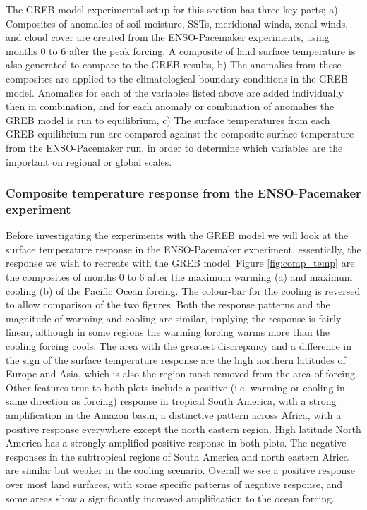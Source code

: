 The GREB model experimental setup for this section has three key parts; a) 
Composites of anomalies of soil moisture, SSTs, meridional winds, zonal winds, 
and cloud cover are created from the ENSO-Pacemaker experiments, using months 0 
to 6 after the peak forcing.  A composite of land surface temperature is also 
generated to compare to the GREB results, b) The anomalies from these composites 
are applied to the climatological boundary conditions in the GREB model.  
Anomalies for each of the variables listed above are added individually then in 
combination, and for each anomaly or combination of anomalies the GREB model is 
run to equilibrium, c) The surface temperatures from each GREB equilibrium run 
are compared against the composite surface temperature from the ENSO-Pacemaker 
run, in order to determine which variables are the important on regional or 
global scales.

\subsubsection{Composite temperature response from the ENSO-Pacemaker 
experiment}

Before investigating the experiments with the GREB model we will look at the 
surface temperature response in the ENSO-Pacemaker experiment, essentially, the 
response we wish to recreate with the GREB model.  Figure \ref{fig:comp_temp} 
are the composites of months 0 to 6 after the maximum warming (a) and maximum 
cooling (b) of the Pacific Ocean forcing. The colour-bar for the cooling is 
reversed to allow comparison of the two figures. Both the response patterns and 
the magnitude of warming and cooling are similar, implying the response is 
fairly linear, although in some regions the warming forcing warms more than the 
cooling forcing cools.  The area with the greatest discrepancy and a difference 
in the sign of the surface temperature response are the high northern latitudes 
of Europe and Asia, which is also the region most removed from the area of 
forcing.  Other features true to both plots include a positive (i.e.  warming or 
cooling in same direction as forcing) response in tropical South America, with a 
strong amplification in the Amazon basin, a distinctive pattern across Africa, 
with a positive response everywhere except the north eastern region. High 
latitude North America has a strongly amplified positive response in both plots.  
The negative responses in the subtropical regions of South America and north 
eastern Africa are similar but weaker in the cooling scenario. Overall we see a 
positive response over most land surfaces, with some specific patterns of 
negative response, and some areas show a significantly increased amplification 
to the ocean forcing.

